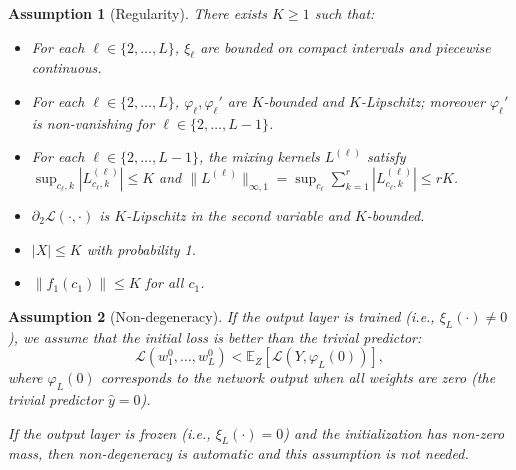 \documentclass[11pt]{article}
\newcommand{\E}{\mathbb{E}}
\newcommand{\1}{\mathbbm{1}}
\newcommand{\norm}[1]{\left\lVert #1 \right\rVert}
\newtheorem{assumption}{Assumption}
\begin{document}
\begin{assumption}[Regularity]\label{assump:regularity-lowrank}
There exists $K\ge 1$ such that:
\begin{itemize}
\item For each $\ell\in\{2,\dots,L\}$, $\xi_\ell$ are bounded on compact intervals and piecewise continuous.
\item For each $\ell\in\{2,\dots,L\}$, $\varphi_\ell,\varphi_\ell'$ are $K$-bounded and $K$-Lipschitz; moreover $\varphi_\ell'$ is non-vanishing for $\ell\in\{2,\dots,L-1\}$.
\item For each $\ell\in\{2,\dots,L-1\}$, the mixing kernels $L^{(\ell)}$ satisfy $\sup_{c_\ell,k}|L^{(\ell)}_{c_\ell,k}|\le K$ and $\|L^{(\ell)}\|_{\infty,1} = \sup_{c_\ell}\sum_{k=1}^r |L^{(\ell)}_{c_\ell,k}| \le rK$.
\item $\partial_2\mathcal{L}(\cdot,\cdot)$ is $K$-Lipschitz in the second variable and $K$-bounded.
\item $|X|\le K$ with probability 1.
\item $\norm{f_1(c_1)}\le K$ for all $c_1$.
\end{itemize}
\end{assumption}

\begin{assumption}[Non-degeneracy]\label{assump:nondegeneracy-lowrank}
If the output layer is trained (i.e., $\xi_L(\cdot) \ne 0$), we assume that the initial loss is better than the trivial predictor:
\[
\mathscr{L}(w_1^0, \ldots, w_L^0) < \E_Z[\mathcal{L}(Y, \varphi_L(0))],
\]
where $\varphi_L(0)$ corresponds to the network output when all weights are zero (the trivial predictor $\hat{y} = 0$).

If the output layer is frozen (i.e., $\xi_L(\cdot) = 0$) and the initialization has non-zero mass, then non-degeneracy is automatic and this assumption is not needed.
\end{assumption}
\end{document}
